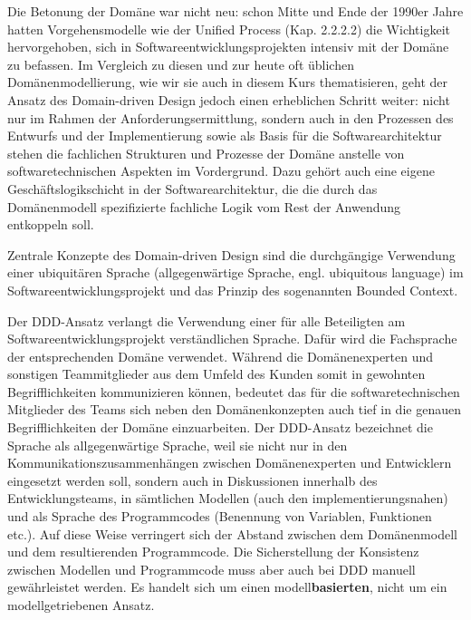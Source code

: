 Die Betonung der Domäne war nicht neu: schon Mitte und Ende der 1990er Jahre hatten Vorgehensmodelle wie der Unified Process (Kap. 2.2.2.2) 
die Wichtigkeit hervorgehoben, sich in Softwareentwicklungsprojekten intensiv mit der Domäne zu befassen. Im Vergleich zu diesen und zur heute oft üblichen Domänenmodellierung, wie wir sie auch in diesem Kurs thematisieren, geht der Ansatz des Domain-driven Design jedoch einen erheblichen Schritt weiter: nicht nur im Rahmen der Anforderungsermittlung, sondern auch in den Prozessen des Entwurfs und der Implementierung sowie als Basis für die 
Softwarearchitektur stehen die fachlichen Strukturen und Prozesse der Domäne anstelle von softwaretechnischen Aspekten im Vordergrund. Dazu gehört auch eine eigene Geschäftslogikschicht in der Softwarearchitektur, die die durch das Domänenmodell spezifizierte fachliche Logik vom Rest der Anwendung entkoppeln soll.

Zentrale Konzepte des Domain-driven Design sind die durchgängige Verwendung einer ubiquitären Sprache (allgegenwärtige Sprache, engl. ubiquitous language) im Softwareentwicklungsprojekt und das Prinzip des sogenannten Bounded Context. 

Der DDD-Ansatz 
verlangt die Verwendung einer für alle Beteiligten am Softwareentwicklungsprojekt verständlichen Sprache. Dafür wird die Fachsprache der entsprechenden Domäne verwendet. Während die Domänenexperten und sonstigen Teammitglieder aus dem Umfeld des Kunden somit in gewohnten Begrifflichkeiten kommunizieren können, bedeutet das für die softwaretechnischen Mitglieder des Teams sich neben den Domänenkonzepten auch tief in die genauen Begrifflichkeiten der Domäne einzuarbeiten. Der DDD-Ansatz bezeichnet die Sprache als allgegenwärtige Sprache, weil sie nicht nur in den Kommunikationszusammenhängen zwischen Domänenexperten und Entwicklern eingesetzt werden soll, sondern auch in Diskussionen innerhalb des Entwicklungsteams, in sämtlichen Modellen (auch den implementierungsnahen) und als Sprache des Programmcodes (Benennung von Variablen, Funktionen etc.). Auf diese Weise verringert sich der Abstand zwischen dem Domänenmodell und dem resultierenden Programmcode. Die Sicherstellung der Konsistenz zwischen Modellen und Programmcode muss aber auch bei DDD manuell gewährleistet werden. Es handelt sich um einen modell\textbf{basierten}, nicht um ein modellgetriebenen Ansatz.

